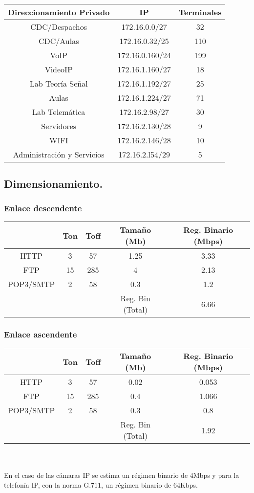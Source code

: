 \documentclass[a4paper,10pt]{article}
\begin{document}
\begin{tabular}{|c|c|c|}
\hline  \textbf{Direccionamiento Privado} & IP & Terminales \\ 
\hline  CDC/Despachos & 172.16.0.0/27 & 32 \\ 
\hline  CDC/Aulas & 172.16.0.32/25 & 110 \\ 
\hline  VoIP & 172.16.0.160/24 & 199 \\ 
\hline  VideoIP & 172.16.1.160/27 & 18 \\ 
\hline  Lab Teoría Señal & 172.16.1.192/27 & 25 \\ 
\hline  Aulas & 172.16.1.224/27 & 71 \\ 
\hline  Lab Telemática & 172.16.2.98/27 & 30 \\ 
\hline  Servidores & 172.16.2.130/28 & 9 \\ 
\hline  WIFI & 172.16.2.146/28 & 10 \\ 
\hline  Administración y Servicios & 172.16.2.l54/29 & 5 \\ 
\hline 
\end{tabular} 


\subsection{Dimensionamiento.}
\subsubsection{Enlace descendente}

\begin{tabular}{|c|c|c|c|c|}
\hline  & Ton & Toff & Tamaño (Mb) & Reg. Binario (Mbps) \\ 
\hline HTTP & 3 & 57 & 1.25 & 3.33 \\ 
\hline FTP & 15 & 285 & 4 & 2.13 \\ 
\hline POP3/SMTP & 2 & 58 & 0.3 & 1.2 \\ 
\hline  &  &  & Reg. Bin (Total) & 6.66 \\ 
\hline 
\end{tabular} 

\subsubsection{Enlace ascendente}

\begin{tabular}{|c|c|c|c|c|}
\hline  & Ton & Toff & Tamaño (Mb) & Reg. Binario (Mbps) \\ 
\hline HTTP & 3 & 57 & 0.02 & 0.053 \\ 
\hline FTP & 15 & 285 & 0.4 & 1.066 \\ 
\hline POP3/SMTP & 2 & 58 & 0.3 & 0.8 \\ 
\hline  &  &  & Reg. Bin (Total) & 1.92 \\ 
\hline 
\end{tabular} \\ \\
En el caso de las cámaras IP se estima un régimen binario de 4Mbps y para la telefonía IP, con la norma G.711, un régimen binario de 64Kbps.
\end{document}
